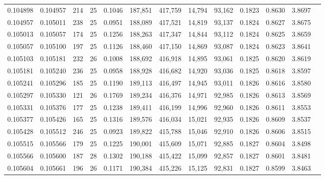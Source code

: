 \begin{tabular}{rrrrrrrrrrrrr}
0.104898 & 0.104957 & 214 &  25 &                                     0.1046 & 187,851 & 417,759 &  14,794 &  93,162 & 0.1823 & 0.8630 & 3.8697 \\
0.104957 & 0.105011 & 238 &  25 &                                     0.0951 & 188,089 & 417,521 &  14,819 &  93,137 & 0.1824 & 0.8627 & 3.8675 \\
0.105013 & 0.105057 & 174 &  25 &                                     0.1256 & 188,263 & 417,347 &  14,844 &  93,112 & 0.1824 & 0.8625 & 3.8659 \\
0.105057 & 0.105100 & 197 &  25 &                                     0.1126 & 188,460 & 417,150 &  14,869 &  93,087 & 0.1824 & 0.8623 & 3.8641 \\
0.105103 & 0.105181 & 232 &  26 &                                     0.1008 & 188,692 & 416,918 &  14,895 &  93,061 & 0.1825 & 0.8620 & 3.8619 \\
0.105181 & 0.105240 & 236 &  25 &                                     0.0958 & 188,928 & 416,682 &  14,920 &  93,036 & 0.1825 & 0.8618 & 3.8597 \\
0.105241 & 0.105296 & 185 &  25 &                                     0.1190 & 189,113 & 416,497 &  14,945 &  93,011 & 0.1826 & 0.8616 & 3.8580 \\
0.105297 & 0.105330 & 121 &  26 &                                     0.1769 & 189,234 & 416,376 &  14,971 &  92,985 & 0.1826 & 0.8613 & 3.8569 \\
0.105331 & 0.105376 & 177 &  25 &                                     0.1238 & 189,411 & 416,199 &  14,996 &  92,960 & 0.1826 & 0.8611 & 3.8553 \\
0.105377 & 0.105426 & 165 &  25 &                                     0.1316 & 189,576 & 416,034 &  15,021 &  92,935 & 0.1826 & 0.8609 & 3.8537 \\
0.105428 & 0.105512 & 246 &  25 &                                     0.0923 & 189,822 & 415,788 &  15,046 &  92,910 & 0.1826 & 0.8606 & 3.8515 \\
0.105515 & 0.105566 & 179 &  25 &                                     0.1225 & 190,001 & 415,609 &  15,071 &  92,885 & 0.1827 & 0.8604 & 3.8498 \\
0.105566 & 0.105600 & 187 &  28 &                                     0.1302 & 190,188 & 415,422 &  15,099 &  92,857 & 0.1827 & 0.8601 & 3.8481 \\
0.105604 & 0.105661 & 196 &  26 &                                     0.1171 & 190,384 & 415,226 &  15,125 &  92,831 & 0.1827 & 0.8599 & 3.8463 \\

\end{tabular}
